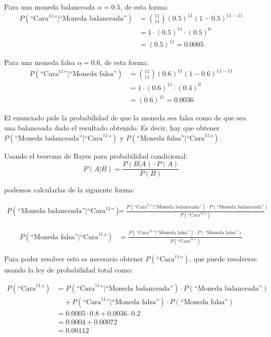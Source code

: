 \documentclass[11pt,a4paper]{article}
\begin{document}
Para una moneda balanceada $\alpha = 0.5$, de esta forma:
\begin{align*}
P(\text{``Cara}^{11}\text{''} | \text{``Moneda balanceada''}) &= \binom{11}{11} (0.5)^{11} (1-0.5)^{11-11} \\
&= 1 \cdot (0.5)^{11} \cdot (0.5)^0 \\
&= (0.5)^{11} = 0.0005
\end{align*}

Para una moneda falsa $\alpha = 0.6$, de esta forma:
\begin{align*}
P(\text{``Cara}^{11}\text{''} | \text{``Moneda falsa''}) &= \binom{11}{11} (0.6)^{11} (1-0.6)^{11-11} \\
&= 1 \cdot (0.6)^{11} \cdot (0.4)^0 \\
&= (0.6)^{11} = 0.0036
\end{align*}

El enunciado pide la probabilidad de que la moneda sea falsa como de que sea una balanceada dado el resultado obtenido. Es decir, hay que obtener $P(\text{``Moneda balanceada''} | \text{``Cara}^{11}\text{''})$ y $P(\text{``Moneda falsa''} | \text{``Cara}^{11}\text{''})$.

Usando el teorema de Bayes para probabilidad condicional:
\[
P(A|B) = \frac{P(B|A) \cdot P(A)}{P(B)}
\]

podemos calcularlas de la siguiente forma:

\begin{align*}
P(\text{``Moneda balanceada''} | \text{``Cara}^{11}\text{''}) &= \frac{P(\text{``Cara}^{11}\text{''} | \text{``Moneda balanceada''}) \cdot P(\text{``Moneda balanceada''})}{P(\text{``Cara}^{11}\text{''})}
\end{align*}

\begin{align*}
P(\text{``Moneda falsa''} | \text{``Cara}^{11}\text{''}) &= \frac{P(\text{``Cara}^{11}\text{''} | \text{``Moneda falsa''}) \cdot P(\text{``Moneda falsa''})}{P(\text{``Cara}^{11}\text{''})}
\end{align*}

Para poder resolver esto es necesario obtener $P(\text{``Cara}^{11}\text{''})$, que puede resolverse usando la ley de probabilidad total como:

\begin{align*}
P(\text{``Cara}^{11}\text{''}) &= P(\text{``Cara}^{11}\text{''} | \text{``Moneda balanceada''}) \cdot P(\text{``Moneda balanceada''}) \\
&\quad + P(\text{``Cara}^{11}\text{''} | \text{``Moneda falsa''}) \cdot P(\text{``Moneda falsa''}) \\
&= 0.0005 \cdot 0.8 + 0.0036 \cdot 0.2 \\
&= 0.0004 + 0.00072 \\
&= 0.00112
\end{align*}
\end{document}
